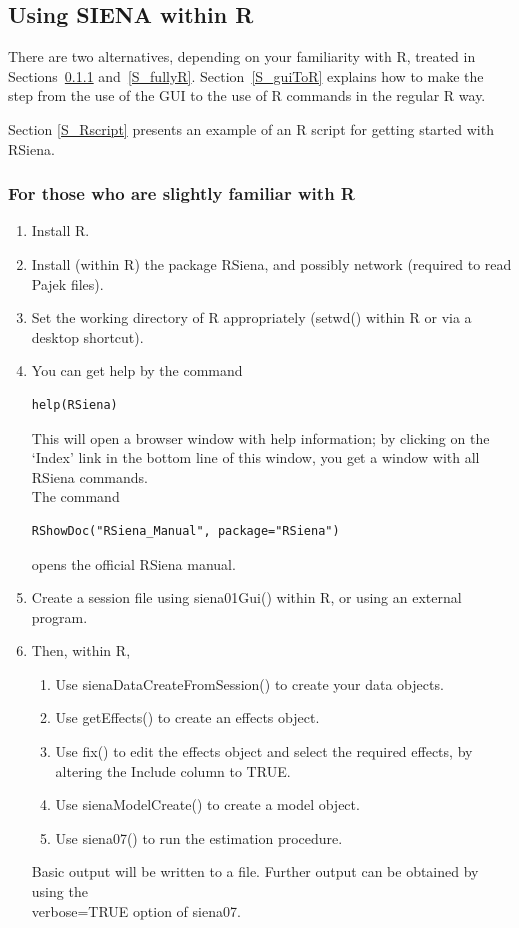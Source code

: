 \documentclass[a4paper,fleqn,11pt]{article}
\newcommand{\+}{\, + \,}
\newcommand{\sfn}[1]{\textsf{#1}}
\newcommand{\R}{{\sf R }}
\newcommand{\Rn}{{\sf R}}
\newcommand{\rs}{{\sf RSiena}}
\newcommand{\RS}{{\sf RSiena }}
\newcommand{\SI}{{\sf SIENA }}
\begin{document}
{\subsection{Using \SI within \Rn}
\label{S_SR}

There are two alternatives, depending on your familiarity with \Rn,
treated in Sections~\ref{S_slightlyR} and~\ref{S_fullyR}.
Section~\ref{S_guiToR} explains how to make the step from the use of the
GUI to the use of \R commands in the regular \R way.

Section \ref{S_Rscript} presents an example of an \R script
for getting started with \rs.

\smallskip

\subsubsection{For those who are slightly familiar with \Rn}
\label{S_slightlyR}

\begin{enumerate}
\item Install \Rn.
\item Install (within \Rn) the package \rs, and
  possibly \sfn{network} (required to read Pajek files).
\item Set the working directory of \R appropriately (\sfn{setwd()} within \Rn
 or via a desktop shortcut).
\item You can get help by the command
\begin{verbatim}
help(RSiena)
\end{verbatim}
      This will open a browser window with help information;
      by clicking on the `Index' link in the bottom line of this window,
      you get a window with all  \RS commands.\\
      The command
\begin{verbatim}
RShowDoc("RSiena_Manual", package="RSiena")
\end{verbatim}
      opens the official \RS manual.
\item Create a session file using \sfn{siena01Gui()} within \Rn, or using an
  external program.
\item Then, within \Rn,
\begin{enumerate}
\item Use \sfn{sienaDataCreateFromSession()} to create your data objects.
\item Use \sfn{getEffects()} to create an effects object.
\item Use \sfn{fix()} to edit the effects object and select the required
  effects, by altering the \sfn{Include} column to \sfn{TRUE}.
\item Use \sfn{sienaModelCreate()} to create a model object.
\item Use \sfn{siena07()} to run the estimation procedure.
\end{enumerate}
Basic output will be written to a file. Further output can be obtained by using
the\\ \sfn{verbose=TRUE} option of \sfn{siena07}.
\end{enumerate}

}
\end{document}
